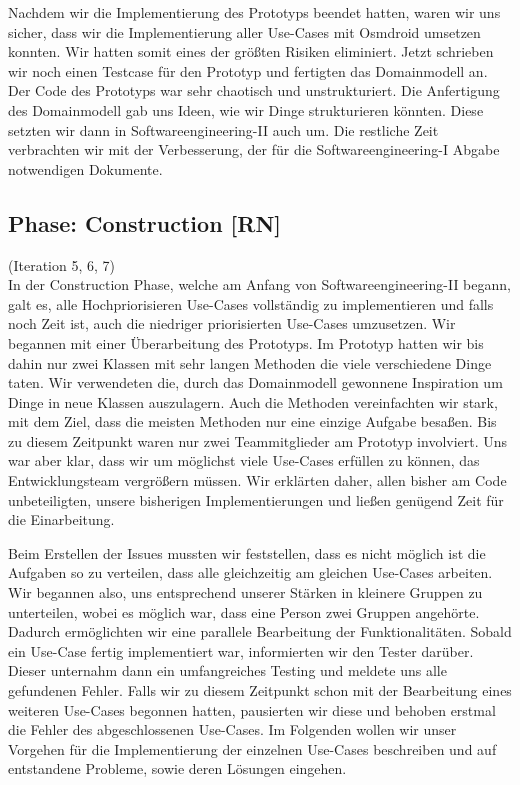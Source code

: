 \documentclass[10pt]{article}
\begin{document}
\newpage
Nachdem wir die Implementierung des Prototyps beendet hatten, waren wir uns sicher, dass
wir die Implementierung aller Use-Cases mit Osmdroid umsetzen konnten. Wir hatten somit eines der größten Risiken eliminiert.
Jetzt schrieben wir noch einen Testcase für den Prototyp und fertigten das Domainmodell an. Der Code des Prototyps war
sehr chaotisch und unstrukturiert. Die Anfertigung des Domainmodell gab uns Ideen, wie wir Dinge strukturieren könnten.
Diese setzten wir dann in Softwareengineering-II auch um.
Die restliche Zeit verbrachten wir mit der Verbesserung,
der für die Softwareengineering-I Abgabe notwendigen Dokumente.

\subsection{Phase: Construction [RN]}
(Iteration 5, 6, 7) \\
In der Construction Phase, welche am Anfang von Softwareengineering-II begann, galt es,
alle Hochpriorisieren Use-Cases vollständig zu implementieren und falls noch Zeit ist, auch
die niedriger priorisierten Use-Cases umzusetzen. Wir begannen mit einer Überarbeitung des Prototyps. Im Prototyp hatten 
wir bis dahin nur zwei Klassen mit sehr langen Methoden die viele verschiedene Dinge taten. Wir verwendeten 
die, durch das Domainmodell gewonnene Inspiration um Dinge in neue Klassen auszulagern. Auch die Methoden 
vereinfachten wir stark, mit dem Ziel, dass die meisten Methoden nur eine einzige Aufgabe besaßen.
Bis zu diesem Zeitpunkt waren nur zwei Teammitglieder am Prototyp involviert. Uns war aber klar, dass wir um möglichst 
viele Use-Cases erfüllen zu können, das Entwicklungsteam vergrößern müssen. Wir erklärten daher, allen bisher am Code 
unbeteiligten, unsere bisherigen Implementierungen und ließen genügend Zeit für die Einarbeitung.\par 
\medskip
Beim Erstellen der Issues mussten wir feststellen, dass es nicht möglich ist die Aufgaben so zu verteilen, dass 
alle gleichzeitig am gleichen Use-Cases arbeiten. 
Wir begannen also, uns entsprechend unserer Stärken in kleinere Gruppen zu unterteilen, wobei
es möglich war, dass eine Person zwei Gruppen angehörte. Dadurch ermöglichten 
wir eine parallele Bearbeitung der Funktionalitäten. Sobald ein Use-Case fertig implementiert war, informierten 
wir den Tester darüber. Dieser unternahm dann ein umfangreiches Testing und meldete uns alle gefundenen Fehler.
Falls wir zu diesem Zeitpunkt schon mit der Bearbeitung eines weiteren Use-Cases begonnen hatten, pausierten wir diese 
und behoben erstmal die Fehler des abgeschlossenen Use-Cases.
Im Folgenden wollen wir unser Vorgehen für die Implementierung der einzelnen 
Use-Cases beschreiben und auf entstandene Probleme, sowie deren Lösungen eingehen.
\end{document}
